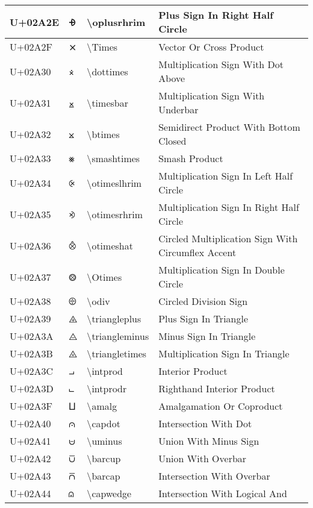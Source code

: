 \begin{table}[h]
\begin{tabulary}{\linewidth}{|L|L|L|L|}
\hline
U+02A2E & ⨮ & {\textbackslash}oplusrhrim & Plus Sign In Right Half Circle \\
\hline
U+02A2F & ⨯ & {\textbackslash}Times & Vector Or Cross Product \\
\hline
U+02A30 & ⨰ & {\textbackslash}dottimes & Multiplication Sign With Dot Above \\
\hline
U+02A31 & ⨱ & {\textbackslash}timesbar & Multiplication Sign With Underbar \\
\hline
U+02A32 & ⨲ & {\textbackslash}btimes & Semidirect Product With Bottom Closed \\
\hline
U+02A33 & ⨳ & {\textbackslash}smashtimes & Smash Product \\
\hline
U+02A34 & ⨴ & {\textbackslash}otimeslhrim & Multiplication Sign In Left Half Circle \\
\hline
U+02A35 & ⨵ & {\textbackslash}otimesrhrim & Multiplication Sign In Right Half Circle \\
\hline
U+02A36 & ⨶ & {\textbackslash}otimeshat & Circled Multiplication Sign With Circumflex Accent \\
\hline
U+02A37 & ⨷ & {\textbackslash}Otimes & Multiplication Sign In Double Circle \\
\hline
U+02A38 & ⨸ & {\textbackslash}odiv & Circled Division Sign \\
\hline
U+02A39 & ⨹ & {\textbackslash}triangleplus & Plus Sign In Triangle \\
\hline
U+02A3A & ⨺ & {\textbackslash}triangleminus & Minus Sign In Triangle \\
\hline
U+02A3B & ⨻ & {\textbackslash}triangletimes & Multiplication Sign In Triangle \\
\hline
U+02A3C & ⨼ & {\textbackslash}intprod & Interior Product \\
\hline
U+02A3D & ⨽ & {\textbackslash}intprodr & Righthand Interior Product \\
\hline
U+02A3F & ⨿ & {\textbackslash}amalg & Amalgamation Or Coproduct \\
\hline
U+02A40 & ⩀ & {\textbackslash}capdot & Intersection With Dot \\
\hline
U+02A41 & ⩁ & {\textbackslash}uminus & Union With Minus Sign \\
\hline
U+02A42 & ⩂ & {\textbackslash}barcup & Union With Overbar \\
\hline
U+02A43 & ⩃ & {\textbackslash}barcap & Intersection With Overbar \\
\hline
U+02A44 & ⩄ & {\textbackslash}capwedge & Intersection With Logical And \\

\end{tabulary}
\end{table}
